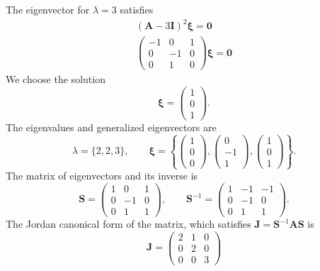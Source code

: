 {\begin{Solution}
\begin{enumerate}
\[    \]
    The eigenvector for $\lambda = 3$ satisfies
    \begin{gather*}
      (\mathbf{A} - 3 \mathbf{I})^2 \boldsymbol{\xi} = \mathbf{0} \\
      \begin{pmatrix}
        -1 & 0 & 1 \\
        0 & -1 & 0 \\
        0 & 1 & 0
      \end{pmatrix} \boldsymbol{\xi} = \mathbf{0} 
    \end{gather*}
    We choose the solution
    \[
    \boldsymbol{\xi} = \begin{pmatrix} 1 \\ 0 \\ 1 \end{pmatrix}.
    \]
    The eigenvalues and generalized eigenvectors are
    \[
    \lambda = \{ 2, 2, 3 \}, \qquad
    \boldsymbol{\xi} =  \left\{
      \begin{pmatrix} 1 \\ 0 \\ 0 \end{pmatrix},
      \begin{pmatrix} 0 \\ -1 \\ 1 \end{pmatrix},
      \begin{pmatrix} 1 \\ 0 \\ 1 \end{pmatrix}
    \right\}.
    \]
    The matrix of eigenvectors and its inverse is 
    \[
    \mathbf{S} = 
    \begin{pmatrix}
      1 & 0 & 1 \\
      0 & -1 & 0 \\
      0 & 1 & 1
    \end{pmatrix}, \qquad
    \mathbf{S}^{-1} = 
    \begin{pmatrix}
      1 & -1 & -1 \\
      0 & -1 & 0 \\
      0 & 1 & 1
    \end{pmatrix}.
    \]
    The Jordan canonical form of the matrix, which satisfies
    $\mathbf{J} = \mathbf{S}^{-1} \mathbf{A} \mathbf{S}$ is
    \[
    \mathbf{J} = 
    \begin{pmatrix}
      2 & 1 & 0 \\
      0 & 2 & 0 \\
      0 & 0 & 3
    \end{pmatrix}
\]
\end{enumerate}
\end{Solution}}
